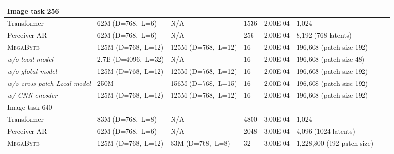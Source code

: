 \documentclass{article}
\newcommand{\fastslow}[0]{\textsc{MegaByte}\xspace}
\newcommand{\megabyte}[0]{\fastslow}
\theoremstyle{plain}
\theoremstyle{definition}
\theoremstyle{remark}
\begin{document}
\begin{table}[h]
\begin{tabular}{llllllll}
\midrule
Image task 256\\
\midrule
Transformer & 62M  (D=768,~L=6) & N/A &  1536  &  2.00E-04 &  1,024  \\
Perceiver AR & 62M (D=768,~L=6)  & N/A &  256 &   2.00E-04 &  8,192 (768 latents)  \\
\megabyte & 125M (D=768,~L=12) & 125M (D=768,~L=12) &  16  &  2.00E-04 &  196,608 (patch size 192)  \\
\hspace{5pt} \textit{w/o local model}  & 2.7B (D=4096,~L=32) & N/A &  16  &  2.00E-04 &  196,608 (patch size 48)  \\
\hspace{5pt} \textit{w/o global model}  &  125M (D=768,~L=12) & 125M (D=768,~L=12)  &  16  &  2.00E-04 &  196,608 (patch size 192)  \\
\hspace{5pt} \textit{w/o cross-patch Local model}  & 250M & 156M (D=768,~L=15) &  16  &  2.00E-04 &  196,608 (patch size 192)  \\
\hspace{5pt} \textit{w/ CNN encoder}  & 125M (D=768,~L=12) & 125M (D=768,~L=12)  &  16  &  2.00E-04 &  196,608 (patch size 192)  \\

\midrule
Image task 640 \\
\midrule
Transformer & 83M (D=768,~L=8)  & N/A & 4800  & 3.00E-04 & 1,024 \\
Perceiver AR  & 62M (D=768,~L=6)  & N/A  & 2048  & 3.00E-04 & 4,096 (1024 latents)  \\
\megabyte & 125M (D=768,~L=12)  & 83M (D=768,~L=8) & 32  & 3.00E-04  & 1,228,800 (192 patch size) \\


\end{tabular}
\end{table}
\end{document}
